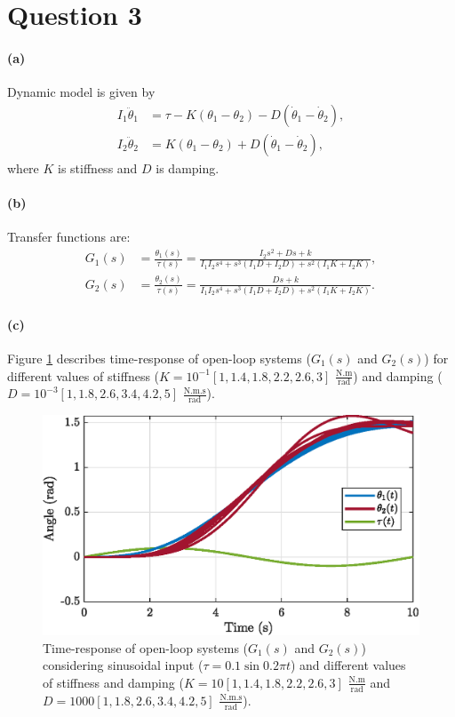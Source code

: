 \section{Question 3}
\paragraph{(a)} Dynamic model is given by
\begin{align*}
I_1 \ddot{\theta}_1 &= \tau - K(\theta_1 - \theta_2) - D(\dot{\theta}_1 - \dot{\theta}_2), 
\\
I_2 \ddot{\theta}_2 &= K(\theta_1 - \theta_2) + D(\dot{\theta}_1 - \dot{\theta}_2), 
\end{align*}
\noindent where $K$ is stiffness and $D$ is damping.


\paragraph{(b)} Transfer functions are:
\begin{align*}
G_1(s) &=\frac{\theta_1(s)}{\tau(s)} = \frac{I_2 s^2 + Ds + k}{I_1 I_2 s^4 + s^3(I_1 D + I_2 D) + s^2 (I_1 K + I_2 K) }, \\ 
G_2(s) &=\frac{\theta_2(s)}{\tau(s)} = \frac{Ds + k}{I_1 I_2 s^4 + s^3(I_1 D + I_2 D) + s^2 (I_1 K + I_2 K) }.
\end{align*}


\paragraph{(c)} Figure \ref{fig:q3_OL} describes time-response of open-loop systems ($G_1(s)$ and $G_2(s)$) for different values of stiffness ($K=10^{-1}[1, 1.4, 1.8, 2.2, 2.6, 3]$ $\mathrm{\frac{N.m}{rad}}$) and damping ($D=10^{-3}[1, 1.8, 2.6, 3.4, 4.2, 5]$ $\mathrm{\frac{N.m.s}{rad}}$).

\begin{figure}[h!]
\centering
\includegraphics{images/question3/q3_OL.eps}
\caption{Time-response of open-loop systems ($G_1(s)$ and $G_2(s)$) considering sinusoidal input ($\tau=0.1\sin{0.2\pi t}$) and different values of stiffness and damping ($K=10[1, 1.4, 1.8, 2.2, 2.6, 3]$ $\mathrm{\frac{N.m}{rad}}$ and $D=1000[1, 1.8, 2.6, 3.4, 4.2, 5]$ $\mathrm{\frac{N.m.s}{rad}}$). }
\label{fig:q3_OL}
\end{figure}



